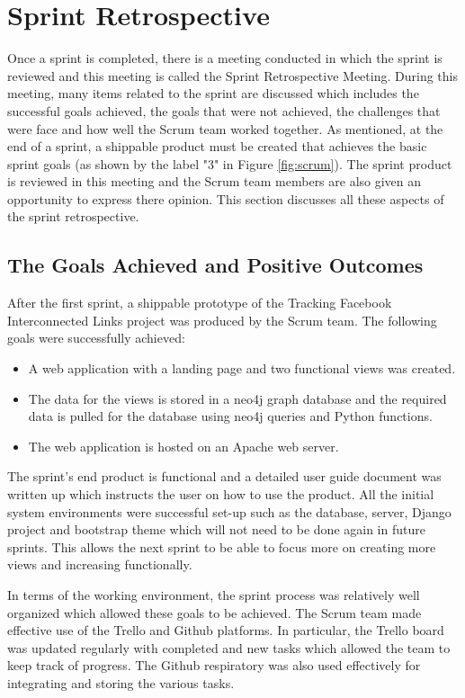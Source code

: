 \documentclass[12pt,onecolumn]{article}
\begin{document}
	\section{Sprint Retrospective} \label{retro}
	Once a sprint is completed, there is a meeting conducted in which the sprint is reviewed and this meeting is called the Sprint Retrospective Meeting. During this meeting, many items related to the sprint are discussed which includes the successful goals achieved, the goals that were not achieved, the challenges that were face and how well the Scrum team worked together. As mentioned, at the end of a sprint, a shippable product must be created that achieves the basic sprint goals (as shown by the label "3" in Figure \ref{fig:scrum}). The sprint product is reviewed in this meeting and the Scrum team members are also given an opportunity to express there opinion. This section discusses all these aspects of the sprint retrospective.
	
	\subsection{The Goals Achieved and Positive Outcomes}
	After the first sprint, a shippable prototype of the Tracking Facebook Interconnected Links project was produced by the Scrum team. The following goals were successfully achieved:
	
	\begin{itemize}
		\item A web application with a landing page and two functional views was created.
		\item The data for the views is stored in a neo4j graph database and the required data is pulled for the database using neo4j queries and Python functions.
		\item The web application is hosted on an Apache web server.
	\end{itemize}
	
	The sprint's end product is functional and a detailed user guide document was written up which instructs the user on how to use the product. All the initial system environments were successful set-up such as the database, server, Django project and bootstrap theme which will not need to be done again in future sprints. This allows the next sprint to be able to focus more on creating more views and increasing functionally. 
	
	In terms of the working environment, the sprint process was relatively well organized which allowed these goals to be achieved. The Scrum team made effective use of the Trello and Github platforms. In particular, the Trello board was updated regularly with completed and new tasks which allowed the team to keep track of progress. The Github respiratory was also used effectively for integrating and storing the various tasks.
	
\end{document}
